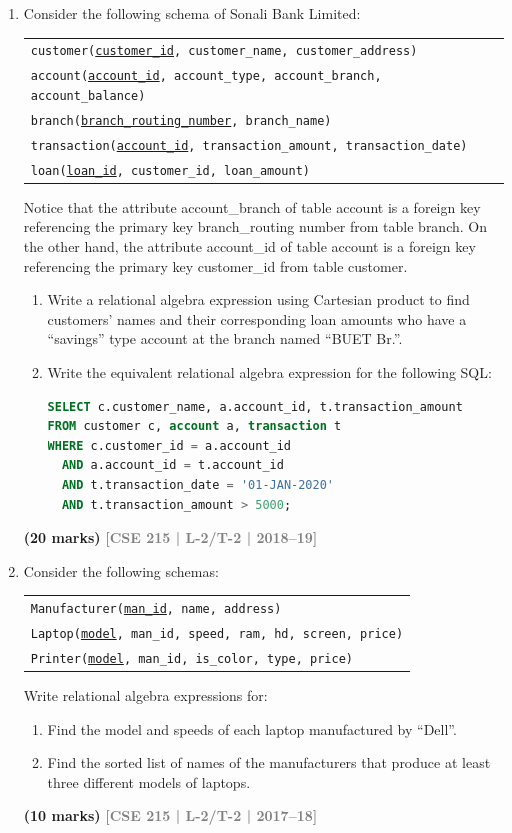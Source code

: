 \documentclass[12pt,a3paper]{article}
\newcommand{\yr}[1]{\hfill\textcolor{gray}{\small\textbf{[#1]}}}
\newcommand{\mk}[1]{\textcolor{orange!70!black}{\small\textbf{(#1 marks)}}}
\begin{document}
\begin{enumerate}
\item Consider the following schema of Sonali Bank Limited:
\begin{center}
\begin{tabular}{l}
\texttt{customer(\underline{customer\_id}, customer\_name, customer\_address)}\\
\texttt{account(\underline{account\_id}, account\_type, account\_branch, account\_balance)}\\
\texttt{branch(\underline{branch\_routing\_number}, branch\_name)}\\
\texttt{transaction(\underline{account\_id}, transaction\_amount, transaction\_date)}\\
\texttt{loan(\underline{loan\_id}, customer\_id, loan\_amount)}
\end{tabular}
\end{center}
Notice that the attribute account_branch of table account is a foreign key referencing
the primary key branch_routing number from table branch. On the other hand,
the attribute account_id of table account is a foreign key referencing the primary key
customer_id from table customer.
\begin{enumerate}
  \item Write a relational algebra expression using Cartesian product to find customers' names and their corresponding loan amounts who have a ``savings'' type account at the branch named ``BUET Br.''.
  \item Write the equivalent relational algebra expression for the following SQL:
\begin{lstlisting}[language=SQL]
SELECT c.customer_name, a.account_id, t.transaction_amount
FROM customer c, account a, transaction t
WHERE c.customer_id = a.account_id
  AND a.account_id = t.account_id
  AND t.transaction_date = '01-JAN-2020'
  AND t.transaction_amount > 5000;
\end{lstlisting}
\end{enumerate}
\mk{20} \yr{CSE 215 | L-2/T-2 | 2018--19}

\item Consider the following schemas:
\begin{center}
\begin{tabular}{l}
\texttt{Manufacturer(\underline{man\_id}, name, address)}\\
\texttt{Laptop(\underline{model}, man\_id, speed, ram, hd, screen, price)}\\
\texttt{Printer(\underline{model}, man\_id, is\_color, type, price)}
\end{tabular}
\end{center}
Write relational algebra expressions for:
\begin{enumerate}
  \item Find the model and speeds of each laptop manufactured by ``Dell''.
  \item Find the sorted list of names of the manufacturers that produce at least three different models of laptops.
\end{enumerate}
\mk{10} \yr{CSE 215 | L-2/T-2 | 2017--18}


\end{enumerate}
\end{document}
